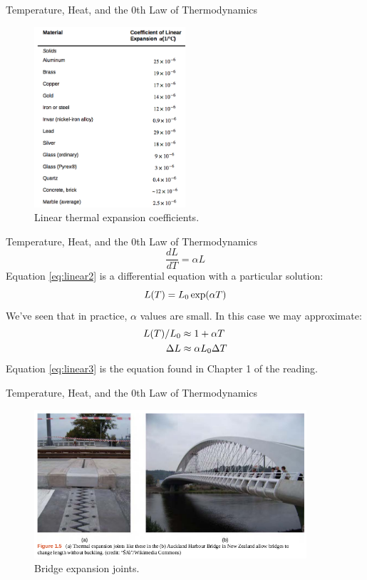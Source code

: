 \documentclass{beamer}
\begin{document}
\begin{frame}{Temperature, Heat, and the 0th Law of Thermodynamics}
\begin{figure}
\centering
\includegraphics[width=0.5\textwidth]{figures/linear.png}
\caption{\label{fig:linear} Linear thermal expansion coefficients.}
\end{figure}
\end{frame}

\begin{frame}{Temperature, Heat, and the 0th Law of Thermodynamics} 
\begin{equation}
\frac{dL}{dT} = \alpha L
\label{eq:linear2}
\end{equation}
Equation \ref{eq:linear2} is a differential equation with a particular solution:
\begin{equation}
L(T) = L_{\rm 0}\exp(\alpha T) \label{eq:exp}
\end{equation}
We've seen that in practice, $\alpha$ values are small.  In this case we may approximate:
\begin{align}
L(T)/L_{\rm 0} &\approx 1+\alpha T \\
\Delta L &\approx \alpha L_{\rm 0} \Delta T \label{eq:linear3}
\end{align}
Equation \ref{eq:linear3} is the equation found in Chapter 1 of the reading.
\end{frame}

\begin{frame}{Temperature, Heat, and the 0th Law of Thermodynamics}
\begin{figure}
\centering
\includegraphics[width=0.9\textwidth]{figures/bridge.png}
\caption{\label{fig:bridge} Bridge expansion joints.}
\end{figure}
\end{frame}
\end{document}
